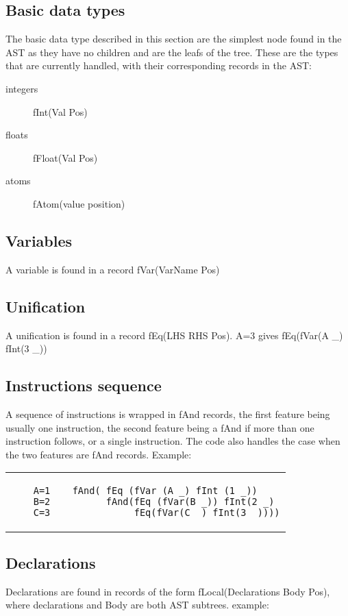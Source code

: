 \documentclass[a4paper]{memoir}
\begin{document}
\subsection{Basic data types}
The basic data type described in this section are the simplest node found in the AST as they have no children and are the leafs of the tree.
These are the types that are currently handled, with their corresponding records in the AST:
\begin{description}
  \item[integers] fInt(Val Pos)
  \item[floats] fFloat(Val Pos)
  \item[atoms] fAtom(value position)
\end{description}

\subsection{Variables}
A variable is found in a record fVar(VarName Pos)

\subsection{Unification}
A unification is found in a record fEq(LHS RHS Pos).
A=3 gives fEq(fVar(A \_) fInt(3 \_))

\subsection{Instructions sequence}
A sequence of instructions is wrapped in fAnd records, the first feature being usually one instruction, the second feature being a fAnd if more than one instruction follows,  or a single instruction. The code also handles the case when the two features are fAnd records. %
Example:\\
\begin{tabular}{ p{} p{} }
  \begin{lstlisting}
    A=1
    B=2
    C=3
  \end{lstlisting}
&
  \footnotesize{
  \begin{verbatim}
  fAnd( fEq (fVar (A _) fInt (1 _))
        fAnd(fEq (fVar(B _)) fInt(2 _) 
             fEq(fVar(C _) fInt(3 _))))
  \end{verbatim}
  }
\end{tabular}

\subsection{Declarations}
Declarations are found in records of the form fLocal(Declarations Body Pos), where declarations and Body are both AST subtrees. 
example:
\end{document}
